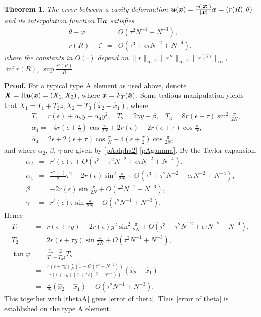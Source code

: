 \documentclass[12pt]{article}
\renewcommand{\vec}[1]{\mbox{\boldmath$#1$}}
\newtheorem{theorem}{Theorem}[section]
\numberwithin{equation}{section}
\begin{document}
\begin{theorem}\label{error of interpolation}
The error between a cavity deformation
$\vec{u}(\vec{x})=\frac{r(|\vec{x}|)}{|\vec{x}|}\vec{x}=(r(R),\theta)$ and its
interpolation function $\Pi \vec{u}$ satisfies
\begin{eqnarray}\label{error of theta}
\theta - \varphi &=& O(\tau^2N^{-1}+N^{-3}), \\
\label{error of r}
r(R)-\zeta &=& O(\tau^3+\epsilon\tau N^{-2}+N^{-4}),
\end{eqnarray}
where the constants in $O(\cdot)$ depend on $\|r\|_\infty$, $\|r''\|_\infty$,
$\|r^{(3)}\|_\infty$, $\inf r(R)$, $\sup \frac{r'(R)}{R}$.
\end{theorem}
\textbf{Proof.} For a typical type A element as used above, denote
$\vec{X}=\Pi \vec{u}(\vec{x})=(X_1,X_2)$, where $\vec{x}=F_T(\hat{\vec{x}})$.
Some tedious manipulation yields that
$X_1=T_1+T_2z, X_2=T_3(\hat{x}_2-\hat{x}_1)$,
where
\begin{eqnarray*}
&&T_1=r(\epsilon)+\alpha_2 y+\alpha_4 y^2, \;\;\; T_2=2\gamma y-\beta, \;\;\;
T_3=8r(\epsilon+\tau)\sin^2{\frac{\pi}{2N}},\\
&&\alpha_4=-4r(\epsilon+\frac{\tau}{2})\cos{\frac{\pi}{2N}}+2r(\epsilon)+
2r(\epsilon+\tau)\cos{\frac{\pi}{N}},\\
&&\hat{\alpha}_4=2\epsilon+2(\epsilon+\tau)\cos{\frac{\pi}{N}}-
4(\epsilon+\frac{\tau}{2})\cos{\frac{\pi}{2N}},
\end{eqnarray*}
and where $\alpha_2$, $\beta$, $\gamma$ are given by \eqref{pAalpha2}-\eqref{pAgamma}.
By the Taylor expansion,
\begin{eqnarray}
\alpha_2&=&r'(\epsilon)\tau+O(\tau^3+\tau^2N^{-2}+\epsilon\tau N^{-2}+N^{-4}),\label{alpha2}\\
\alpha_4&=&\frac{r''(\epsilon)}{2}\tau^2-2r(\epsilon)\sin^2{\frac{\pi}{2N}}+
O(\tau^3+\tau^2N^{-2}+\epsilon \tau N^{-2}+N^{-4}),\label{alpha4}\\
\beta&=& -2r(\epsilon)\sin{\frac{\pi}{2N}}+O(\tau^2 N^{-1}+N^{-3}),\label{beta}\\
\gamma&=&r'(\epsilon)\tau \sin{\frac{\pi}{2N}}+O(\tau^2 N^{-1}+N^{-3}).\label{gamma}
\end{eqnarray}
Hence
\begin{eqnarray*}
 T_1&=&r(\epsilon+\tau y)-2r(\epsilon)y^2\sin^2{\frac{\pi}{2N}}+
O(\tau^{3}+\tau^2N^{-2}+\epsilon \tau N^{-2}+N^{-4}),\\
T_2&=&2r(\epsilon+\tau y)\sin{\frac{\pi}{2N}}+O(\tau^2N^{-1}+N^{-3}),\\
\tan{\varphi} &=&\frac{\hat{x}_2-\hat{x}_1}{T_1+T_3z}T_2\\
&=&\frac{r(\epsilon+\tau y)\frac{\pi}{N}(1+O(\tau^2+N^{-2}))}{r(\epsilon+
\tau y)(1+O(\tau^3+N^{-2}))}(\hat{x}_2-\hat{x}_1)\\
&=&\frac{\pi}{N}(\hat{x}_2-\hat{x}_1)+O(\tau^2N^{-1}+N^{-3}).
\end{eqnarray*}
This together with \eqref{thetaA} gives \eqref{error of theta}. Thus
\eqref{error of theta} is established on the type A element.
\end{document}
